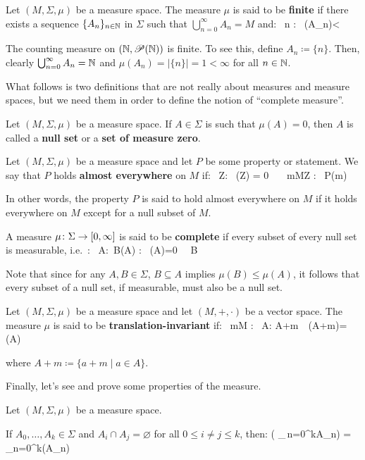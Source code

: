 Let $(M,\Sigma,\mu)$ be a measure space. The measure $\mu$ is said to be \textbf{finite} if there exists a sequence
$\{A_n\}_{n\in\mathbb{N}}$ in $\Sigma$ such that $\bigcup_{n=0}^{\infty}A_n=M$ and:
\bse
\forall \, n \in \N : \ \mu(A_n)<\infty
\ese
\ed

\be
The counting measure on $(\mathbb{N},\mathscr{P}(\mathbb{N}))$ is finite. To see this, define $A_n \coloneqq \{n\}$. Then, clearly
$\bigcup_{n=0}^{\infty}A_n=\mathbb{N}$ and $\mu(A_n)=|\{n\}|=1<\infty$ for all $n\in \mathbb{N}$.
\ee

What follows is two definitions that are not really about measures and measure spaces, but we need them in order to
define the notion of ``complete measure''.

Let $(M,\Sigma,\mu)$ be a measure space. If $A\in\Sigma$ is such that $\mu (A)=0$, then $A$ is called a \textbf{null
set} or a \textbf{set of measure zero}.
\ed

Let $(M,\Sigma,\mu)$ be a measure space and let $P$ be some property or statement. We say that $P$ holds
\textbf{almost everywhere} on $M$ if:
\bse
\exists \, Z\in \Sigma : \ \mu(Z) = 0 \,  \, \forall \, m\in M\setminus Z : \, P(m)
\ese
\ed

In other words, the property $P$ is said to hold almost everywhere on $M$ if it holds everywhere on $M$ except for a
null subset of $M$.

A measure $\mu\colon \Sigma\to [0,\infty]$ is said to be \textbf{complete} if every subset of every null set is
measurable, i.e.\ :
\bse
\forall \, A\in \Sigma :\forall \, B\in{}(A) : \ \mu(A)=0 \, \Rightarrow \, B\in\Sigma
\ese
\ed

Note that since for any $A,B\in\Sigma$, $B\subseteq A$ implies $\mu(B) \leq\mu(A)$, it follows that every subset of a
null set, if measurable, must also be a null set.

Let $(M,\Sigma,\mu)$ be a measure space and let $(M,+,\cdot)$ be a vector space. The measure $\mu$ is said to be
\textbf{translation-invariant} if:
\bse
\forall \, m\in M : \forall \, A\in \Sigma : \quad A+m\in\Sigma\ \ \mu(A+m)=\mu(A)
\ese

where $A+m \coloneqq \{a+m\mid a\in A\}$.
\ed

Finally, let's see and prove some properties of the measure.

\bt[]
Let $(M,\Sigma,\mu)$ be a measure space.
\ben[label=(\roman*)]
\item If $A_0,\ldots,A_k \in \Sigma$ and $A_i \cap A_j = \varnothing$ for all $0\leq i\neq j\leq k$, then:
\bse
\mu \biggl( \bigcup_{\,n=0}^{k}A_n\biggr) = \sum_{n=0}^{k}\mu(A_n)
\ese

